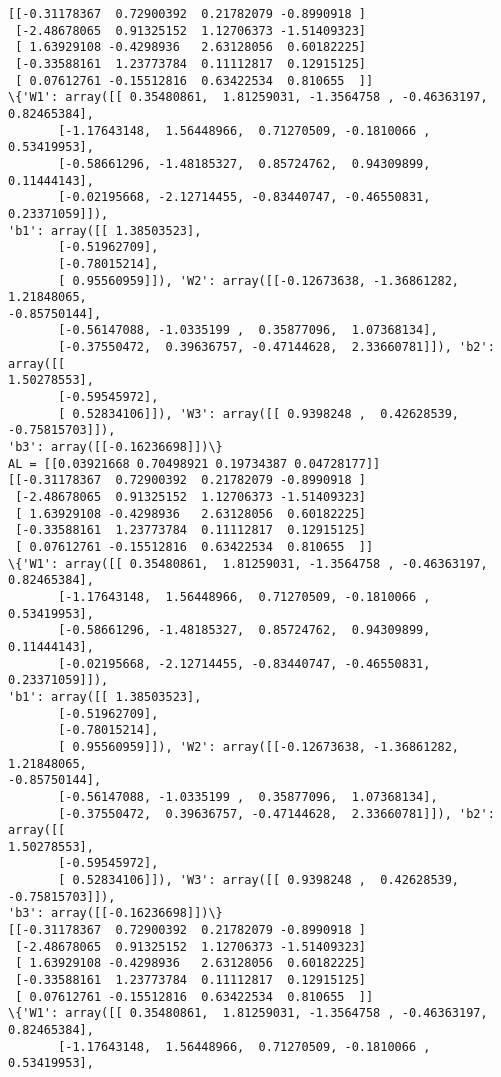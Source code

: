 \documentclass[11pt]{article}
\begin{document}
    \begin{Verbatim}[commandchars=\\\{\}]
[[-0.31178367  0.72900392  0.21782079 -0.8990918 ]
 [-2.48678065  0.91325152  1.12706373 -1.51409323]
 [ 1.63929108 -0.4298936   2.63128056  0.60182225]
 [-0.33588161  1.23773784  0.11112817  0.12915125]
 [ 0.07612761 -0.15512816  0.63422534  0.810655  ]]
\{'W1': array([[ 0.35480861,  1.81259031, -1.3564758 , -0.46363197,  0.82465384],
       [-1.17643148,  1.56448966,  0.71270509, -0.1810066 ,  0.53419953],
       [-0.58661296, -1.48185327,  0.85724762,  0.94309899,  0.11444143],
       [-0.02195668, -2.12714455, -0.83440747, -0.46550831,  0.23371059]]),
'b1': array([[ 1.38503523],
       [-0.51962709],
       [-0.78015214],
       [ 0.95560959]]), 'W2': array([[-0.12673638, -1.36861282,  1.21848065,
-0.85750144],
       [-0.56147088, -1.0335199 ,  0.35877096,  1.07368134],
       [-0.37550472,  0.39636757, -0.47144628,  2.33660781]]), 'b2': array([[
1.50278553],
       [-0.59545972],
       [ 0.52834106]]), 'W3': array([[ 0.9398248 ,  0.42628539, -0.75815703]]),
'b3': array([[-0.16236698]])\}
AL = [[0.03921668 0.70498921 0.19734387 0.04728177]]
[[-0.31178367  0.72900392  0.21782079 -0.8990918 ]
 [-2.48678065  0.91325152  1.12706373 -1.51409323]
 [ 1.63929108 -0.4298936   2.63128056  0.60182225]
 [-0.33588161  1.23773784  0.11112817  0.12915125]
 [ 0.07612761 -0.15512816  0.63422534  0.810655  ]]
\{'W1': array([[ 0.35480861,  1.81259031, -1.3564758 , -0.46363197,  0.82465384],
       [-1.17643148,  1.56448966,  0.71270509, -0.1810066 ,  0.53419953],
       [-0.58661296, -1.48185327,  0.85724762,  0.94309899,  0.11444143],
       [-0.02195668, -2.12714455, -0.83440747, -0.46550831,  0.23371059]]),
'b1': array([[ 1.38503523],
       [-0.51962709],
       [-0.78015214],
       [ 0.95560959]]), 'W2': array([[-0.12673638, -1.36861282,  1.21848065,
-0.85750144],
       [-0.56147088, -1.0335199 ,  0.35877096,  1.07368134],
       [-0.37550472,  0.39636757, -0.47144628,  2.33660781]]), 'b2': array([[
1.50278553],
       [-0.59545972],
       [ 0.52834106]]), 'W3': array([[ 0.9398248 ,  0.42628539, -0.75815703]]),
'b3': array([[-0.16236698]])\}
[[-0.31178367  0.72900392  0.21782079 -0.8990918 ]
 [-2.48678065  0.91325152  1.12706373 -1.51409323]
 [ 1.63929108 -0.4298936   2.63128056  0.60182225]
 [-0.33588161  1.23773784  0.11112817  0.12915125]
 [ 0.07612761 -0.15512816  0.63422534  0.810655  ]]
\{'W1': array([[ 0.35480861,  1.81259031, -1.3564758 , -0.46363197,  0.82465384],
       [-1.17643148,  1.56448966,  0.71270509, -0.1810066 ,  0.53419953],

\end{Verbatim}
\end{document}
